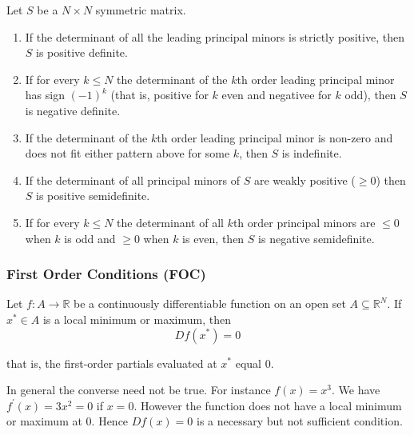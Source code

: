 \documentclass{article}
\begin{document}
\begin{theorem}
  Let $S$ be a $N \times N$ symmetric matrix.
  \begin{enumerate}
    \item If the determinant of all the leading principal minors is strictly positive, then $S$ is positive definite.

    \item If for every $k \le N$ the determinant of the $k$th order leading principal minor has sign $(-1)^k$ (that is, positive for $k$ even and negativee for $k$ odd), then $S$ is negative definite.

    \item If the determinant of the $k$th order leading principal minor is non-zero and does not fit either pattern above for some $k$, then $S$ is indefinite.

    \item If the determinant of all principal minors of $S$ are weakly positive ($\ge 0$) then $S$ is positive semidefinite.

    \item If for every $k \le N$ the determinant of all $k$th order principal minors are $\le 0$ when $k$ is odd and $\ge 0$ when $k$ is even, then $S$ is negative semidefinite.
  \end{enumerate}
\end{theorem}

\subsubsection{First Order Conditions (FOC)}
\label{ssub:first_order_conditions_foc_}

\begin{theorem}
  Let $f: A \to \mathbb{R}$ be a continuously differentiable function on an open set $A \subseteq \mathbb{R}^N$. If $x^* \in A$ is a local minimum or maximum, then
  \[
    D f(x^*) = 0
  \]

  that is, the first-order partials evaluated at $x^*$ equal $0$.
\end{theorem}

\begin{remark}
  In general the converse need not be true. For instance $f(x) = x^3$. We have $f^\prime(x) = 3x^2 = 0$ if $x = 0$. However the function does not have a local minimum or maximum at $0$. Hence $D f(x) = 0$ is a necessary but not sufficient condition.
\end{remark}
\end{document}
